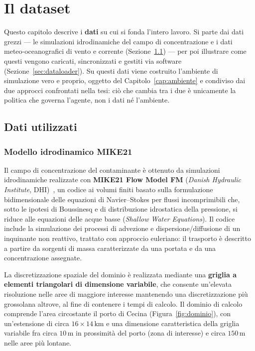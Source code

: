 \chapter{Il dataset}
\label{cap:dati}

Questo capitolo descrive i \textbf{dati} su cui si fonda l'intero lavoro. Si parte dai
dati grezzi --- le simulazioni idrodinamiche del campo di concentrazione e i dati
meteo-oceanografici di vento e corrente (Sezione~\ref{sec:dati}) --- per poi illustrare
come questi vengono caricati, sincronizzati e gestiti via software
(Sezione~\ref{sec:dataloader}). Su questi dati viene costruito l'ambiente di simulazione
vero e proprio, oggetto del Capitolo~\ref{cap:ambiente} e condiviso dai due approcci
confrontati nella tesi: ci\`o che cambia tra i due \`e unicamente la politica che governa
l'agente, non i dati n\'e l'ambiente.

\section{Dati utilizzati}
\label{sec:dati}

\subsection{Modello idrodinamico MIKE21}
\label{sec:mike}

Il campo di concentrazione del contaminante \`e ottenuto da simulazioni idrodinamiche
realizzate con \textbf{MIKE21 Flow Model FM} (\emph{Danish Hydraulic Institute},
DHI)~\citep{mike21}, un codice ai volumi finiti basato sulla formulazione bidimensionale
delle equazioni di Navier--Stokes per flussi incomprimibili che, sotto le ipotesi di
Boussinesq e di distribuzione idrostatica della pressione, si riduce alle equazioni delle
acque basse (\emph{Shallow Water Equations}). Il codice include la simulazione dei
processi di advezione e dispersione/diffusione di un inquinante non reattivo, trattato
con approccio euleriano: il trasporto \`e descritto a partire da sorgenti di massa
caratterizzate da una portata e da una concentrazione assegnate.

La discretizzazione spaziale del dominio \`e realizzata mediante una \textbf{griglia a
elementi triangolari di dimensione variabile}, che consente un'elevata risoluzione nelle
aree di maggiore interesse mantenendo una discretizzazione pi\`u grossolana altrove, al
fine di contenere i tempi di calcolo. Il dominio di calcolo comprende l'area circostante
il porto di Cecina (Figura~\ref{fig:dominio}), con un'estensione di circa
$16 \times 14\,\text{km}$ e una dimensione
caratteristica della griglia variabile fra circa $10\,\text{m}$ in prossimit\`a del porto
(zona di interesse) e circa $150\,\text{m}$ nelle aree pi\`u lontane.

